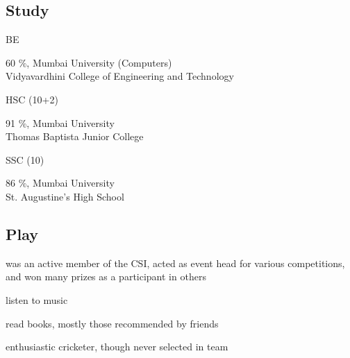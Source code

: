 \documentclass[a4paper,10pt,final]{article}
\newcommand{\resumetitle}[1]{%
	\subsection*{%
		\hspace{-5pt}\large#1%
	}%
	
	\medskip%
}%
\newcommand{\resumedescheader}[1]{%
	\resumetitle{#1}
}%
\newenvironment{resumedescription}{%
	\begin{basedescript}{\desclabelstyle{\nextlinelabel}\desclabelwidth{0.15\linewidth}}{%
		\renewcommand{\makelabel}[1]{\textsl{##1}}%
	}%
	}{%
	\end{basedescript}%
}
\begin{document}
\resumedescheader{Study}
	\begin{resumedescription}
		\item [BE]
			\begin{itemize*}
			\item 60 \%, Mumbai University (Computers) \\
			Vidyavardhini College of Engineering and Technology
			\end{itemize*}
		\item [HSC (10+2)]
			\begin{itemize*}
			\item 91 \%, Mumbai University \\
			Thomas Baptista Junior College
			\end{itemize*}
		\item [SSC (10)]
			\begin{itemize*}
			\item 86 \%, Mumbai University \\ 
			St. Augustine's High School
			\end{itemize*}
	\end{resumedescription}

\resumedescheader{Play}
	\begin{resumedescription}
		\item[]
			\begin{itemize*}
			\item was an active member of the CSI, acted as event head for various competitions, and won many prizes as a participant in others
			\item listen to music 
			\item read books, mostly those recommended by friends
			\item enthusiastic cricketer, though never selected in team
			\end{itemize*}
	\end{resumedescription}
\end{document}
